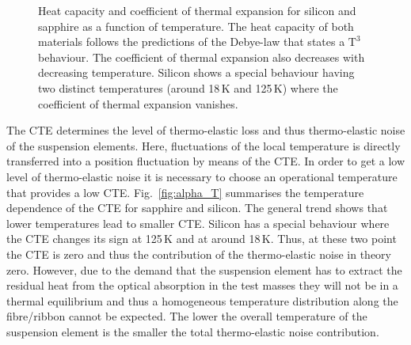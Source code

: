 \begin{figure}[!h]
\begin{center}
\end{center}
\caption{Heat capacity and coefficient of thermal expansion for silicon and sapphire as a function of temperature. The heat capacity of both materials follows the predictions of the Debye-law that states a $\mathrm{T^3}$ behaviour. The coefficient of thermal expansion also decreases with decreasing temperature. Silicon shows a special behaviour having two distinct temperatures (around 18\,K and 125\,K) where the coefficient of thermal expansion vanishes.}
\end{figure}

The CTE determines the level of thermo-elastic loss and thus thermo-elastic noise of the suspension elements. Here, fluctuations of the local temperature is directly transferred into a position fluctuation by means of the CTE. In order to get a low level of thermo-elastic noise it is necessary to choose an operational temperature that provides a low CTE. Fig.~\ref{fig:alpha_T} summarises the temperature dependence of the CTE for sapphire and silicon. The general trend shows that lower temperatures lead to smaller CTE. Silicon has a special behaviour where the CTE changes its sign at 125\,K and at around 18\,K. Thus, at these two point the CTE is zero and thus the contribution of the thermo-elastic noise in theory zero. However, due to the demand that the suspension element has to extract the residual heat from the optical absorption in the test masses they will not be in a thermal equilibrium and thus a homogeneous temperature distribution along the fibre/ribbon cannot be expected. The lower the overall temperature of the suspension element is the smaller the total thermo-elastic noise contribution. 

